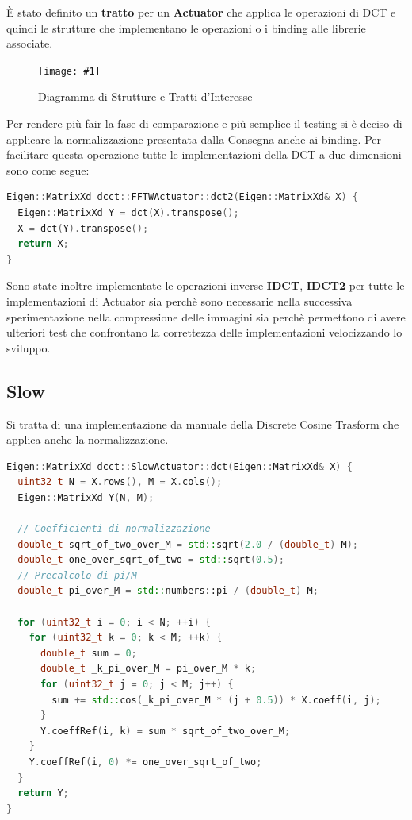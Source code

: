 \documentclass[a4paper,11pt,oneside, table]{article}
\newcommand{\putimage}[4] {
	\begin{figure}[H]
	    \centering
	    \texttt{[image: \#1]}
	    \caption{#2}\label{#3}
	\end{figure}
}
\begin{document}
\`E stato definito un \textbf{tratto} per un \textbf{Actuator} che applica le operazioni di DCT e quindi le strutture che implementano le operazioni o i binding alle librerie associate.

\putimage{images/diagram.png}{Diagramma di Strutture e Tratti d'Interesse}{png:diagram_of_structures}{0.99}

Per rendere pi\`u fair la fase di comparazione e pi\`u semplice il testing si \`e deciso di applicare la normalizzazione presentata dalla Consegna anche ai binding. Per facilitare questa operazione tutte le implementazioni della DCT a due dimensioni sono come segue:

\begin{lstlisting}[language=C++]
Eigen::MatrixXd dcct::FFTWActuator::dct2(Eigen::MatrixXd& X) {
  Eigen::MatrixXd Y = dct(X).transpose();
  X = dct(Y).transpose();
  return X;
}
\end{lstlisting}

Sono state inoltre implementate le operazioni inverse \textbf{IDCT}, \textbf{IDCT2} per tutte le implementazioni di Actuator sia perch\`e sono necessarie nella successiva sperimentazione nella compressione delle immagini sia perch\`e permettono di avere ulteriori test che confrontano la correttezza delle implementazioni velocizzando lo sviluppo.

\subsection{Slow}

Si tratta di una implementazione da manuale della Discrete Cosine Trasform che applica anche la normalizzazione.

\begin{lstlisting}[language=C++]
Eigen::MatrixXd dcct::SlowActuator::dct(Eigen::MatrixXd& X) {
  uint32_t N = X.rows(), M = X.cols();
  Eigen::MatrixXd Y(N, M);

  // Coefficienti di normalizzazione
  double_t sqrt_of_two_over_M = std::sqrt(2.0 / (double_t) M);
  double_t one_over_sqrt_of_two = std::sqrt(0.5);
  // Precalcolo di pi/M
  double_t pi_over_M = std::numbers::pi / (double_t) M;

  for (uint32_t i = 0; i < N; ++i) {
    for (uint32_t k = 0; k < M; ++k) {
      double_t sum = 0;
      double_t _k_pi_over_M = pi_over_M * k;
      for (uint32_t j = 0; j < M; j++) {
        sum += std::cos(_k_pi_over_M * (j + 0.5)) * X.coeff(i, j);
      }
      Y.coeffRef(i, k) = sum * sqrt_of_two_over_M;
    }
    Y.coeffRef(i, 0) *= one_over_sqrt_of_two;
  }
  return Y;
}
\end{lstlisting}
\end{document}
